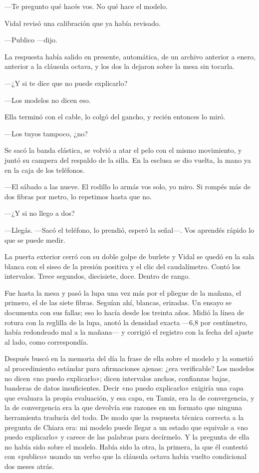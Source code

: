 ---Te pregunto qué hacés vos. No qué hace el modelo.

Vidal revisó una calibración que ya había revisado.

---Publico ---dijo.

La respuesta había salido en presente, automática, de un archivo anterior a enero, anterior a la cláusula octava, y los dos la dejaron sobre la mesa sin tocarla.

---¿Y si te dice que no puede explicarlo?

---Los modelos no dicen eso.

Ella terminó con el cable, lo colgó del gancho, y recién entonces lo miró.

---Los tuyos tampoco, ¿no?

Se sacó la banda elástica, se volvió a atar el pelo con el mismo movimiento, y juntó su campera del respaldo de la silla. En la esclusa se dio vuelta, la mano ya en la caja de los teléfonos.

---El sábado a las nueve. El rodillo lo armás vos solo, yo miro. Si rompés más de dos fibras por metro, lo repetimos hasta que no.

---¿Y si no llego a dos?

---Llegás. ---Sacó el teléfono, lo prendió, esperó la señal---. Vos aprendés rápido lo que se puede medir.

La puerta exterior cerró con su doble golpe de burlete y Vidal se quedó en la sala blanca con el siseo de la presión positiva y el clic del caudalímetro. Contó los intervalos. Trece segundos, diecisiete, doce. Dentro de rango.

Fue hasta la mesa y pasó la lupa una vez más por el pliegue de la mañana, el primero, el de las siete fibras. Seguían ahí, blancas, erizadas. Un ensayo se documenta con sus fallas; eso lo hacía desde los treinta años. Midió la línea de rotura con la reglilla de la lupa, anotó la densidad exacta ---6,8 por centímetro, había redondeado mal a la mañana--- y corrigió el registro con la fecha del ajuste al lado, como correspondía.

Después buscó en la memoria del día la frase de ella sobre el modelo y la sometió al procedimiento estándar para afirmaciones ajenas: ¿era verificable? Los modelos no dicen «no puedo explicarlo»; dicen intervalos anchos, confianzas bajas, banderas de datos insuficientes. Decir «no puedo explicarlo» exigiría una capa que evaluara la propia evaluación, y esa capa, en Tamiz, era la de convergencia, y la de convergencia era la que devolvía sus razones en un formato que ninguna herramienta traducía del todo. De modo que la respuesta técnica correcta a la pregunta de Chiara era: mi modelo puede llegar a un estado que equivale a «no puedo explicarlo» y carece de las palabras para decírmelo. Y la pregunta de ella no había sido sobre el modelo. Había sido la otra, la primera, la que él contestó con «publico» usando un verbo que la cláusula octava había vuelto condicional dos meses atrás.


